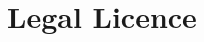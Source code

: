 \documentclass[12pt,twoside,onecolumn,openright,extrafontsizes]{memoir}
\begin{document}
% 
\chapter{Legal Licence}


\end{document}
